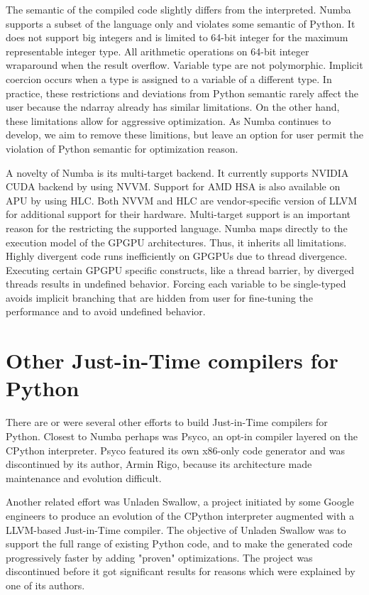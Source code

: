 \documentclass{acm_proc_article-sp}
\begin{document}
The semantic of the compiled code slightly differs
from the interpreted. Numba supports a subset of the language only
and violates some semantic of Python.  It does not support big integers
and is limited to 64-bit integer for the maximum representable integer type.
All arithmetic operations on 64-bit integer wraparound when the result
overflow.  Variable type are not polymorphic.  Implicit coercion occurs when
a type is assigned to a variable of a different type. In practice, these
restrictions and deviations from Python semantic rarely affect the user
because the ndarray already has similar limitations. On the other hand, these
limitations allow for aggressive optimization.  As Numba continues to develop,
we aim to remove these limitions, but leave an option for user permit the
violation of Python semantic for optimization reason.

A novelty of Numba is its multi-target backend.  It currently supports NVIDIA
CUDA backend by using NVVM.  Support for AMD HSA is also available on APU by
using HLC.  Both NVVM and HLC are vendor-specific version of LLVM for
additional support for their hardware.  Multi-target support is an important
reason for the restricting the supported language.
Numba maps directly to the execution model of the GPGPU architectures.
Thus, it inherits all limitations.
Highly divergent code runs inefficiently on GPGPUs due to thread divergence.
Executing certain GPGPU specific constructs, like a thread barrier, by diverged
threads results in undefined behavior. Forcing each variable to be single-typed
avoids implicit branching that are hidden from user for fine-tuning the
performance and to avoid undefined behavior.

\section{Other Just-in-Time compilers for Python}

There are or were several other efforts to build Just-in-Time compilers
for Python.  Closest to Numba perhaps was Psyco, an opt-in compiler layered
on the CPython interpreter.  Psyco featured its own x86-only code generator
and was discontinued by its author, Armin Rigo, because its architecture
made maintenance and evolution difficult.  \cite{wikipedia:psyco}

Another related effort was Unladen Swallow, a project initiated by some
Google engineers to produce an evolution of the CPython interpreter augmented
with a LLVM-based Just-in-Time compiler.  \cite{wikipedia:unladen_swallow}
The objective of Unladen Swallow was to support the full range of existing
Python code, and to make the generated code progressively faster by adding
"proven" optimizations.  The project was discontinued before it got
significant results for reasons which were explained by one of its authors.
\cite{kleckner:unladen_swallow_post_mortem}
\end{document}
